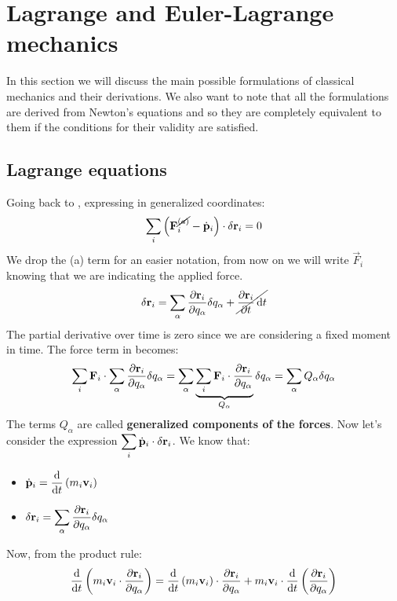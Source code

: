 \chapter[Lagrangian Mechanics]{Lagrange and Euler-Lagrange mechanics}
In this section we will discuss the main possible formulations of classical mechanics and their derivations. We also want to note that all the formulations are derived from Newton's equations and so they are completely equivalent to them if the conditions for their validity are satisfied.
\section{Lagrange equations}
Going back to \dalembertref, expressing in generalized coordinates:
\begin{equation}
    \displaystyle\sum_i \left(\vb{F}^{\cancel{(a)}}_i - \dot{\vb{p}}_i\right) \cdot \delta \vb{r}_i = 0
\end{equation}
We drop the (a) term for an easier notation, from now on we will write $\vec{F}_i$ knowing that we are indicating the applied force.
\begin{equation}
    \delta \vec{r}_i = \bigsum_{\alpha} \pdv{ \vec{r}_i}{ q_{\alpha}} \delta q_{\alpha} + \cancel{\pdv{ \vec{r}_i}{ t} \dd{t}}
\end{equation}
The partial derivative over time is zero since we are considering a fixed moment in time. The force term in \dalembertref\;becomes:
\begin{equation}
    \bigsum_i \vec{F}_i \cdot \bigsum_{\alpha} \pdv{ \vec{r}_i}{ q_{\alpha}} \delta q_{\alpha} = \bigsum_{\alpha}\underbrace{\bigsum_{i} \vec{F}_i \cdot \pdv{ \vec{r}_i}{ q_{\alpha}}}_{Q_{\alpha}} \delta q_{\alpha} = \bigsum_{\alpha}Q_{\alpha}\delta q_{\alpha}
\end{equation}
The terms $Q_{\alpha}$ are called \textbf{generalized components of the forces}.
Now let's consider the expression $\displaystyle\sum_i \dot{\vb{p}}_i \cdot \delta \vb{r}_i$. We know that:
\begin{itemize}
    \item $\dvec{p}_i = \dv{}{t}\brackets{m_i\vec{v}_i}$
    \item $\delta \vec{r}_i = \bigsum_{\alpha} \pdv{ \vec{r}_i}{ q_{\alpha}}\delta q_{\alpha}$
\end{itemize}
Now, from the product rule:
\begin{equation} \label{e:total_deriv}
    \dv{}{t}\brackets{m_i\vec{v}_i \cdot \pdv{ \vec{r}_i}{ q_{\alpha}}} = \dv{}{t}\brackets{m_i\vec{v}_i}\cdot \pdv{ \vec{r}_i}{ q_{\alpha}} + m_i\vec{v}_i \cdot \dv{}{t}\brackets{\pdv{ \vec{r}_i}{ q_{\alpha}}}
\end{equation}
